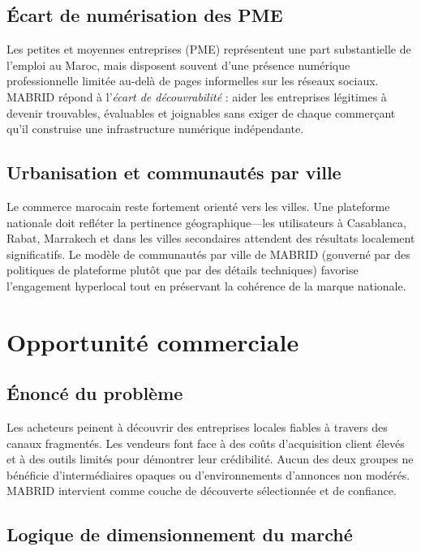 \subsection{Écart de numérisation des PME}

Les petites et moyennes entreprises (PME) représentent une part substantielle de l'emploi au Maroc, mais disposent souvent d'une présence numérique professionnelle limitée au-delà de pages informelles sur les réseaux sociaux. MABRID répond à l'\emph{écart de découvrabilité} : aider les entreprises légitimes à devenir trouvables, évaluables et joignables sans exiger de chaque commerçant qu'il construise une infrastructure numérique indépendante.

\subsection{Urbanisation et communautés par ville}

Le commerce marocain reste fortement orienté vers les villes. Une plateforme nationale doit refléter la pertinence géographique---les utilisateurs à Casablanca, Rabat, Marrakech et dans les villes secondaires attendent des résultats localement significatifs. Le modèle de communautés par ville de MABRID (gouverné par des politiques de plateforme plutôt que par des détails techniques) favorise l'engagement hyperlocal tout en préservant la cohérence de la marque nationale.


\section{Opportunité commerciale}

\subsection{Énoncé du problème}

Les acheteurs peinent à découvrir des entreprises locales fiables à travers des canaux fragmentés. Les vendeurs font face à des coûts d'acquisition client élevés et à des outils limités pour démontrer leur crédibilité. Aucun des deux groupes ne bénéficie d'intermédiaires opaques ou d'environnements d'annonces non modérés. MABRID intervient comme couche de découverte sélectionnée et de confiance.

\subsection{Logique de dimensionnement du marché}

